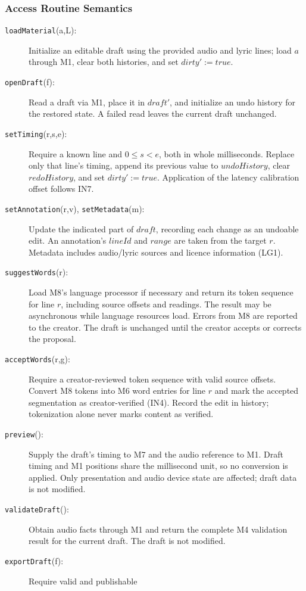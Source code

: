 \documentclass[12pt, titlepage]{article}
\begin{document}
\subsubsection{Access Routine Semantics}
\begin{description}
\item[\texttt{loadMaterial}(a,L):] Initialize an editable draft
using the provided audio and lyric lines; load $a$ through M1,
clear both histories, and set $dirty':=\mathit{true}$.
\item[\texttt{openDraft}(f):] Read a draft via M1, place it in
$draft'$, and initialize an undo history for the restored state.
A failed read leaves the current draft unchanged.
\item[\texttt{setTiming}(r,s,e):] Require a known line and
$0\leq s<e$, both in whole milliseconds. Replace only that line's timing, append
its previous value to $undoHistory$, clear $redoHistory$,
and set $dirty':=\mathit{true}$. Application of the
latency calibration offset follows IN7.
\item[\texttt{setAnnotation}(r,v), \texttt{setMetadata}(m):]
Update the indicated part of $draft$, recording each change
as an undoable edit. An annotation's $lineId$ and $range$ are
taken from the target $r$. Metadata includes audio/lyric sources
and licence information (LG1).
\item[\texttt{suggestWords}(r):] Load M8's language
processor if necessary and return its token sequence for line
$r$, including source offsets and readings. The result may
be asynchronous while language resources load. Errors from
M8 are reported to the creator. The draft is unchanged until
the creator accepts or corrects the proposal.
\item[\texttt{acceptWords}(r,g):] Require a creator-reviewed
token sequence with valid source offsets. Convert M8 tokens
into M6 word entries for line $r$ and mark the accepted
segmentation as creator-verified (IN4). Record the edit in
history; tokenization alone never marks content as verified.
\item[\texttt{preview}():] Supply the draft's timing to M7
and the audio reference to M1. Draft timing and M1 positions
share the millisecond unit, so no conversion is applied. Only presentation and audio
device state are affected; draft data is not modified.
\item[\texttt{validateDraft}():] Obtain audio facts through M1
and return the complete M4 validation result for the current
draft. The draft is not modified.
\item[\texttt{exportDraft}(f):] Require valid and publishable

\end{description}
\end{document}
